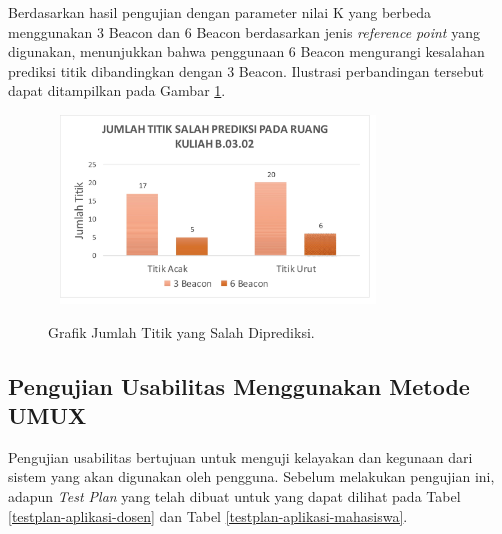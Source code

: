 \begin{enumerate}[a.]
\begin{enumerate}[a.]
\begin{enumerate}
	      \par Berdasarkan hasil pengujian dengan parameter nilai K yang berbeda menggunakan 3 Beacon dan 6 Beacon berdasarkan jenis \textit{reference point} yang digunakan, menunjukkan bahwa penggunaan 6 Beacon mengurangi kesalahan prediksi titik dibandingkan dengan 3 Beacon. Ilustrasi perbandingan tersebut dapat ditampilkan pada Gambar \ref{gambar-grafik-titik-salah-prediksi}.
	      \begin{figure}[H]
		      \center
		      \shadowbox
		      {\includegraphics [width = 9cm, height= 5cm]{gambar/pengujian/grafik-titik-salah-prediksi}}
		      \caption{Grafik Jumlah Titik yang Salah Diprediksi.}
		      \label{gambar-grafik-titik-salah-prediksi}
	      \end{figure}


\end{enumerate}

\subsection{Pengujian Usabilitas Menggunakan Metode UMUX}
\par Pengujian usabilitas bertujuan untuk menguji kelayakan dan kegunaan dari sistem yang akan digunakan oleh pengguna. Sebelum melakukan pengujian ini, adapun \textit{Test Plan} yang telah dibuat untuk yang dapat dilihat pada Tabel \ref{testplan-aplikasi-dosen} dan Tabel \ref{testplan-aplikasi-mahasiswa}.


\end{enumerate}
\end{enumerate}
